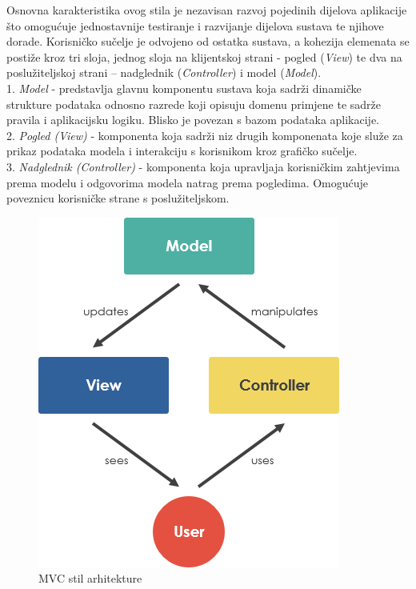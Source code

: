 		Osnovna	karakteristika ovog stila je	nezavisan razvoj	pojedinih dijelova aplikacije što omogućuje jednostavnije testiranje	i razvijanje dijelova sustava te	njihove	dorade.	
Korisničko	sučelje	je	odvojeno od	ostatka	sustava, a kohezija	elemenata se	postiže	kroz	
tri	sloja, jednog sloja	na klijentskoj strani - pogled (\textit{View}) te dva na	poslužiteljskoj	strani	
– nadglednik	(\textit{Controller})	i	model	(\textit{Model}).\\

		1. \textit{Model} - predstavlja glavnu komponentu sustava koja sadrži dinamičke strukture podataka odnosno razrede koji opisuju domenu primjene te sadrže pravila i aplikacijsku logiku. Blisko je povezan s bazom podataka aplikacije.\\
		2. \textit{Pogled (View)} - komponenta koja sadrži niz drugih komponenata koje služe za prikaz podataka modela i interakciju s korisnikom kroz grafičko sučelje.\\
		3. \textit{Nadglednik (Controller)} - komponenta	koja upravljaja	korisničkim	zahtjevima	prema	
modelu i odgovorima modela natrag prema pogledima. Omogućuje	poveznicu	
korisničke	strane	s	poslužiteljskom.\\

		\begin{figure}[H]
			\includegraphics[scale=0.7]{slike/mvc-framework.PNG} 
			\centering
			\caption{MVC stil arhitekture}
			\label{pawBoost}
		\end{figure}
	
